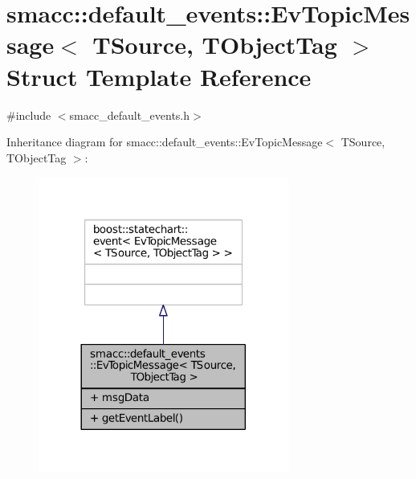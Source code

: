 \hypertarget{structsmacc_1_1default__events_1_1EvTopicMessage}{}\section{smacc\+:\+:default\+\_\+events\+:\+:Ev\+Topic\+Message$<$ T\+Source, T\+Object\+Tag $>$ Struct Template Reference}
\label{structsmacc_1_1default__events_1_1EvTopicMessage}


{\ttfamily \#include $<$smacc\+\_\+default\+\_\+events.\+h$>$}



Inheritance diagram for smacc\+:\+:default\+\_\+events\+:\+:Ev\+Topic\+Message$<$ T\+Source, T\+Object\+Tag $>$\+:
\nopagebreak
\begin{figure}[H]
\begin{center}
\leavevmode
\includegraphics[width=233pt]{structsmacc_1_1default__events_1_1EvTopicMessage__inherit__graph}
\end{center}
\end{figure}


